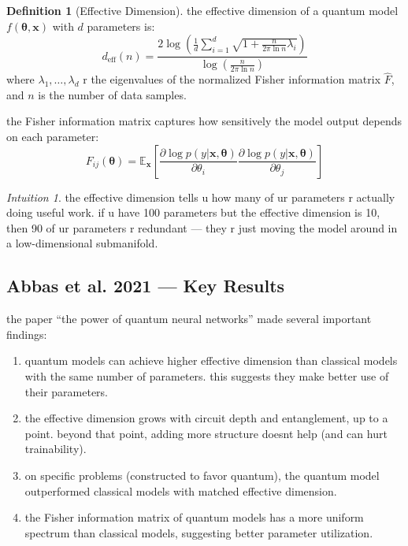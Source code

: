\documentclass[11pt,a4paper]{article}
\theoremstyle{definition}
\newtheorem{definition}{Definition}[section]
\theoremstyle{remark}
\newtheorem*{intuition}{Intuition}
\begin{document}
\begin{definition}[Effective Dimension]
the effective dimension of a quantum model $f(\boldsymbol{\theta}, \mathbf{x})$ with $d$ parameters is:
\[
d_{\text{eff}}(n) = \frac{2 \log\left(\frac{1}{d} \sum_{i=1}^{d} \sqrt{1 + \frac{n}{2\pi \ln n} \lambda_i}\right)}{\log\left(\frac{n}{2\pi \ln n}\right)}
\]
where $\lambda_1, \ldots, \lambda_d$ r the eigenvalues of the normalized Fisher information matrix $\hat{F}$, and $n$ is the number of data samples.
\end{definition}

the Fisher information matrix captures how sensitively the model output depends on each parameter:
\[
F_{ij}(\boldsymbol{\theta}) = \mathbb{E}_{\mathbf{x}}\left[\frac{\partial \log p(y|\mathbf{x}, \boldsymbol{\theta})}{\partial \theta_i} \frac{\partial \log p(y|\mathbf{x}, \boldsymbol{\theta})}{\partial \theta_j}\right]
\]

\begin{intuition}
the effective dimension tells u how many of ur parameters r actually doing useful work. if u have 100 parameters but the effective dimension is 10, then 90 of ur parameters r redundant --- they r just moving the model around in a low-dimensional submanifold.
\end{intuition}

\subsection{Abbas et al. 2021 --- Key Results}

the paper ``the power of quantum neural networks'' made several important findings:

\begin{enumerate}[label=\arabic*.]
    \item quantum models can achieve higher effective dimension than classical models with the same number of parameters. this suggests they make better use of their parameters.

    \item the effective dimension grows with circuit depth and entanglement, up to a point. beyond that point, adding more structure doesnt help (and can hurt trainability).

    \item on specific problems (constructed to favor quantum), the quantum model outperformed classical models with matched effective dimension.

    \item the Fisher information matrix of quantum models has a more uniform spectrum than classical models, suggesting better parameter utilization.
\end{enumerate}
\end{document}
